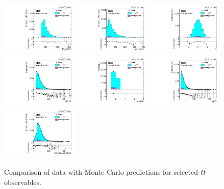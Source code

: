 \begin{figure}[phtb]
  \centering
  \includegraphics[width=0.325\textwidth]{figures/dataMC_ttmass.pdf}
  \includegraphics[width=0.325\textwidth]{figures/dataMC_ttpT.pdf}
  \includegraphics[width=0.325\textwidth]{figures/dataMC_ttRapidity2.pdf}
  \includegraphics[width=0.325\textwidth]{figures/dataMC_jetpT.pdf}
  \includegraphics[width=0.325\textwidth]{figures/dataMC_nbjets.pdf}
  \includegraphics[width=0.325\textwidth]{figures/dataMC_lepPt.pdf}
  \includegraphics[width=0.325\textwidth]{figures/dataMC_met.pdf}
  \caption{Comparison of data with Monte Carlo predictions for
    selected $t\bar{t}$ observables.}
  \label{fig:afb:datamcttvars}
\end{figure}

